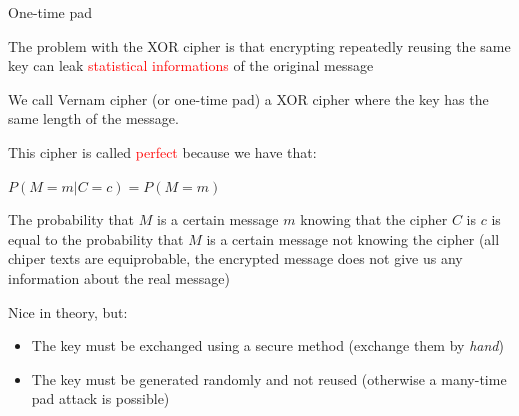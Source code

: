 \begin{frame}{One-time pad}

  \pause

  The problem with the XOR cipher is that encrypting repeatedly reusing the same key can leak \textcolor{red}{statistical informations} of the original message  
  
  \medskip
  
  We call Vernam cipher (or one-time pad) a XOR cipher where the key has the same length of the message. 
  
  \smallskip
  
  This cipher is called \textcolor{red}{perfect} because we have that:
  
  \medskip
  
  \phantom{pad}$P(M = m | C = c) = P(M = m)$
  
  \medskip
  
  The probability that $M$ is a certain message $m$ knowing that the cipher $C$ is $c$ is equal to the probability that $M$ is a certain message not knowing the cipher (all chiper texts are equiprobable, the encrypted message does not give us any information about the real message)
  
  \medskip
  
  \pause

  Nice in theory, but:
  
  \begin{itemize}
    \item The key must be exchanged using a secure method (exchange them by \textit{hand})
    \item The key must be generated randomly and not reused (otherwise a many-time pad attack is possible)
  \end{itemize}

\end{frame}


